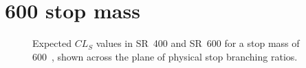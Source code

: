 \FloatBarrier

\newpage
\section{600 \texorpdfstring{\GeV}{GeV} stop mass}

\begin{figure}[ht]
  \centering
  \caption{
    Expected $CL_S$ values in SR~400 and SR~600 for a stop mass of 600~\GeV,
    shown across the plane of physical stop branching ratios.
  }
\end{figure}

